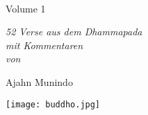 \cleartorecto
\thispagestyle{empty}

\vspace*{1em}

{\centering

\\[0.4\baselineskip]
Volume 1

\vfill

{\itshape 52 Verse aus dem Dhammapada\\
mit Kommentaren\\
von}

\vfill

Ajahn Munindo

\vfill

\texttt{[image: buddho.jpg]}
\vspace*{1.0em}


}
